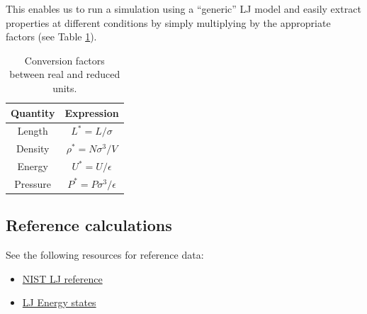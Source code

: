 \documentclass[aip,jcp,preprint,superscriptaddress,floatfix]{revtex4-1}
\begin{document}
This enables us to run a simulation using a ``generic'' LJ model and easily extract properties at different
conditions by simply multiplying by the appropriate factors (see Table \ref{table:reducedUnits}). 

\begin{table}[t]
\centering
 \begin{tabular}{|c c|} 
 \hline
 Quantity & Expression \\ [0.5ex] 
 \hline\hline
 Length &  $L^*=L / \sigma$   \\ 
 Density &  $\rho^* = N \sigma^3 / V$   \\
 Energy &  $U^* = U / \epsilon$   \\
 Pressure &  $P^* = P \sigma^3 / \epsilon$   \\
 \hline
 \end{tabular}
 \caption{Conversion factors between real and reduced units.}
 \label{table:reducedUnits}
\end{table}

\subsection{Reference calculations}

See the following resources for reference data:

\begin{itemize}
\item \href{https://mmlapps.nist.gov/srs/LJ_PURE/mc.htm}{NIST LJ reference}
\item \href{https://www.nist.gov/mml/csd/chemical-informatics-research-group/lennard-jones-fluid-reference-calculations}{LJ Energy states}
\end{itemize}

\newpage
%


\end{document}
